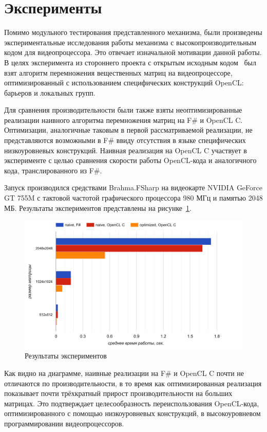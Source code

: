 \section{Эксперименты}
Помимо модульного тестирования представленного механизма, были произведены экспериментальные исследования работы механизма с высокопроизводительным кодом для видеопроцессора. Это отвечает изначальной мотивации данной работы. В целях эксперимента из стороннего проекта с открытым исходным кодом~\cite{MyGEMM} был взят алгоритм перемножения вещественных матриц на видеопроцессоре, оптимизированный с использованием специфических конструкций OpenCL: барьеров и локальных групп.

Для сравнения производительности были также взяты неоптимизированные реализации наивного алгоритма перемножения матриц на F\# и OpenCL C. Оптимизации, аналогичные таковым в первой рассматриваемой реализации, не представляются возможными в F\# ввиду отсутствия в языке специфических низкоуровневых конструкций. Наивная реализация на OpenCL C участвует в эксперименте с целью сравнения скорости работы OpenCL-кода и аналогичного кода, транслированного из F\#.

Запуск производился средствами Brahma.FSharp на видеокарте NVIDIA GeForce GT 755M с тактовой частотой графического процессора 980 МГц и памятью 2048 МБ. Результаты экспериментов представлены на рисунке~\ref{experiments}.

\begin{figure}[h]
\centering
\includegraphics[width=\textwidth]{Smirenko/courseworkpictures/chart.png}
\caption{Результаты экспериментов}
\label{experiments}
\end{figure}

Как видно на диаграмме, наивные реализации на F\# и OpenCL C почти не отличаются по производительности, в то время как оптимизированная реализация показывает почти трёхкратный прирост производительности на больших матрицах. Это подтверждает целесообразность переиспользования OpenCL-кода, оптимизированного с помощью низкоуровневых конструкций, в высокоуровневом программировании видеопроцессоров.

